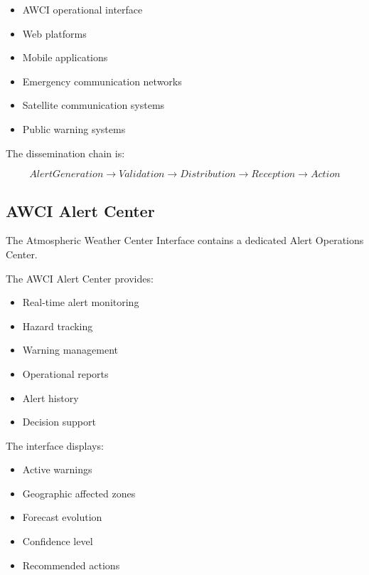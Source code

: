 \begin{itemize}

\item AWCI operational interface

\item Web platforms

\item Mobile applications

\item Emergency communication networks

\item Satellite communication systems

\item Public warning systems

\end{itemize}


The dissemination chain is:

\[
AlertGeneration
\rightarrow
Validation
\rightarrow
Distribution
\rightarrow
Reception
\rightarrow
Action
\]



\subsection{AWCI Alert Center}

The Atmospheric Weather Center Interface contains a dedicated Alert
Operations Center.

The AWCI Alert Center provides:

\begin{itemize}

\item Real-time alert monitoring

\item Hazard tracking

\item Warning management

\item Operational reports

\item Alert history

\item Decision support

\end{itemize}


The interface displays:

\begin{itemize}

\item Active warnings

\item Geographic affected zones

\item Forecast evolution

\item Confidence level

\item Recommended actions

\end{itemize}


